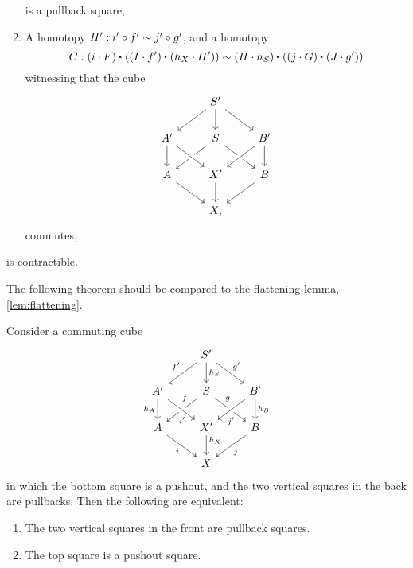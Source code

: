 \begin{cor}
\begin{enumerate}
is a pullback square,
\item A homotopy $H':i'\circ f'\sim j'\circ g'$, and a homotopy
\begin{equation*}
C : \ct{(i\cdot F)}{(\ct{(I\cdot f')}{(h_X\cdot H')})} \htpy \ct{(H\cdot h_S)}{(\ct{(j\cdot G)}{(J\cdot g')})}
\end{equation*}
witnessing that the cube
\begin{equation*}
\begin{tikzcd}
& S' \arrow[dl] \arrow[dr] \arrow[d] \\
A' \arrow[d] & S \arrow[dl] \arrow[dr] & B' \arrow[dl,crossing over] \arrow[d] \\
A \arrow[dr] & X' \arrow[d] \arrow[from=ul,crossing over] & B \arrow[dl] \\
& X,
\end{tikzcd}
\end{equation*}
commutes,
\end{enumerate}
is contractible.
\end{cor}

The following theorem should be compared to the flattening lemma, \cref{lem:flattening}.

\begin{thm}\label{cor:descent}
Consider a commuting cube
\begin{equation*}
\begin{tikzcd}
& S' \arrow[dl,swap,"{f'}"] \arrow[dr,"{g'}"] \arrow[d,"h_S"] \\
A' \arrow[d,swap,"h_A"] & S \arrow[dl,swap,"f" near start] \arrow[dr,"g" near start] & B' \arrow[dl,crossing over,"{j'}" near end] \arrow[d,"h_B"] \\
A \arrow[dr,swap,"i"] & X' \arrow[d,"h_X" near start] \arrow[from=ul,crossing over,"{i'}"' near end] & B \arrow[dl,"j"] \\
& X
\end{tikzcd}
\end{equation*}
in which the bottom square is a pushout, and the two vertical squares in the back are pullbacks. Then the following are equivalent:
\begin{enumerate}
\item The two vertical squares in the front are pullback squares.
\item The top square is a pushout square.
\end{enumerate}
\end{thm}

